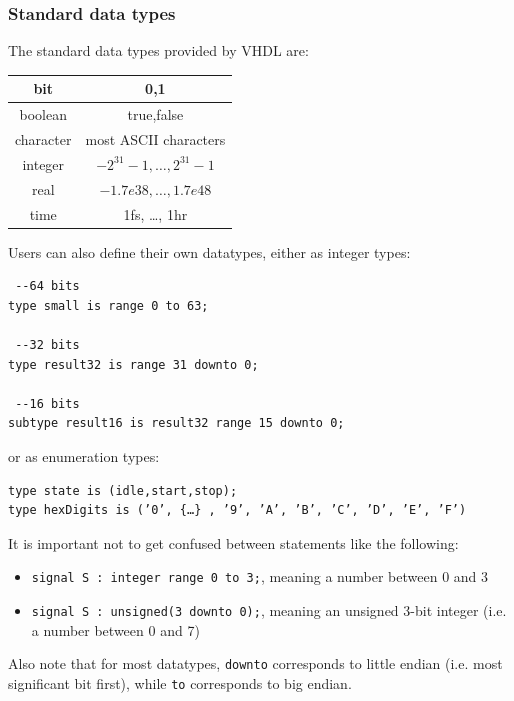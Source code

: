 \documentclass{report}
\newcommand*{\newpar}{\par\vspace{\baselineskip}\noindent} %
\begin{document}
\subsubsection{Standard data types}
The standard data types provided by VHDL are:
\newpar
\begin{tabular}{|c|c|}
    \hline
    bit & 0,1\\\hline
    boolean & true,false\\\hline
    character & most ASCII characters\\\hline
    integer & $-2^{31} - 1, \ldots, 2^{31}-1$\\\hline
    real & $-1.7e38, \ldots, 1.7e48$\\\hline
    time & 1fs, \ldots, 1hr\\\hline
\end{tabular}
\newpar
Users can also define their own datatypes, either as integer types:
\begin{verbatim}
 --64 bits
type small is range 0 to 63;

 --32 bits
type result32 is range 31 downto 0;

 --16 bits
subtype result16 is result32 range 15 downto 0;
\end{verbatim}
or as enumeration types:
\begin{verbatim}
type state is (idle,start,stop);
type hexDigits is (’0’, {…} , ’9’, ’A’, ’B’, ’C’, ’D’, ’E’, ’F’)
\end{verbatim}
\newpar
It is important not to get confused between statements like the following:
\begin{itemize}
 \item \texttt{signal S : integer range 0 to 3;}, meaning a number between 0 and 3
 \item \texttt{signal S : unsigned(3 downto 0);}, meaning an unsigned 3-bit integer (i.e. a number between 0 and 7)
\end{itemize}
Also note that for most datatypes, \texttt{downto} corresponds to little endian (i.e. most significant bit first), while \texttt{to} corresponds to big endian.
\end{document}
